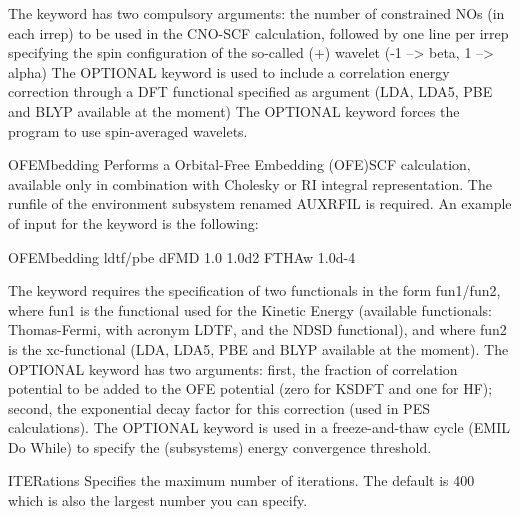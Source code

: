 \begin{keywordlist}
\begin{inputlisting}
\end{inputlisting}
The keyword  has two compulsory arguments: the number of constrained NOs
(in each irrep) to be used in the CNO-SCF calculation, followed by one line per irrep specifying the spin configuration
of the so-called (+) wavelet (-1 --> beta,  1 --> alpha)
The OPTIONAL keyword  is used to include a correlation energy correction through a DFT functional specified as argument (LDA, LDA5, PBE and BLYP available at the moment)
The OPTIONAL keyword  forces the program to use spin-averaged wavelets.
\item[OFEMbedding]
Performs a Orbital-Free Embedding (OFE)SCF calculation, available only in combination with Cholesky or RI integral representation.
The runfile of the environment subsystem renamed AUXRFIL is required.
An example of input for the keyword  is the following:
\begin{inputlisting}

OFEMbedding
 ldtf/pbe
dFMD
 1.0   1.0d2
FTHAw
 1.0d-4

\end{inputlisting}
The keyword  requires the specification of two functionals in the form fun1/fun2, where fun1 is the functional
used for the Kinetic Energy (available functionals: Thomas-Fermi, with acronym LDTF, and the NDSD functional), and where
fun2 is the xc-functional (LDA, LDA5, PBE and BLYP available at the moment).
The OPTIONAL keyword  has two arguments: first, the fraction of correlation potential to be added to the
OFE potential (zero for KSDFT and one for HF); second, the exponential decay factor for this correction (used in PES calculations).
The OPTIONAL keyword  is used in a freeze-and-thaw cycle (EMIL Do While) to specify the (subsystems) energy convergence threshold.
\item[ITERations]
Specifies the maximum number of iterations. The default is 400 which
is also the largest number you can specify.


\end{keywordlist}
